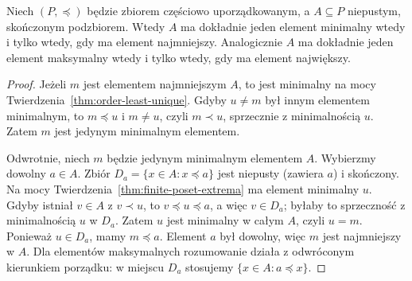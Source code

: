 \begin{twierdzenie}
\label{thm:unique-minimal-finite-xliii}
Niech $(P,\preceq)$ będzie zbiorem częściowo uporządkowanym,
a $A\subseteq P$ niepustym, skończonym podzbiorem.
Wtedy $A$ ma dokładnie jeden element minimalny wtedy i tylko
wtedy, gdy ma element najmniejszy.
Analogicznie $A$ ma dokładnie jeden element maksymalny
wtedy i tylko wtedy, gdy ma element największy.
\end{twierdzenie}
\begin{proof}
Jeżeli $m$ jest elementem najmniejszym $A$, to jest
minimalny na mocy Twierdzenia~\ref{thm:order-least-unique}.
Gdyby $u\ne m$ był innym elementem minimalnym, to
$m\preceq u$ i $m\ne u$, czyli $m\prec u$,
sprzecznie z minimalnością $u$. Zatem $m$ jest jedynym
minimalnym elementem.

Odwrotnie, niech $m$ będzie jedynym minimalnym elementem $A$.
Wybierzmy dowolny $a\in A$. Zbiór
$D_a=\{x\in A:x\preceq a\}$ jest niepusty (zawiera $a$)
i skończony. Na mocy
Twierdzenia~\ref{thm:finite-poset-extrema} ma element
minimalny $u$. Gdyby istniał $v\in A$ z $v\prec u$,
to $v\preceq u\preceq a$, a więc $v\in D_a$;
byłaby to sprzeczność z minimalnością $u$ w $D_a$.
Zatem $u$ jest minimalny w całym $A$, czyli $u=m$.
Ponieważ $u\in D_a$, mamy $m\preceq a$. Element $a$
był dowolny, więc $m$ jest najmniejszy w $A$.
Dla elementów maksymalnych rozumowanie działa z odwróconym
kierunkiem porządku: w miejscu $D_a$ stosujemy
$\{x\in A:a\preceq x\}$.
\end{proof}

